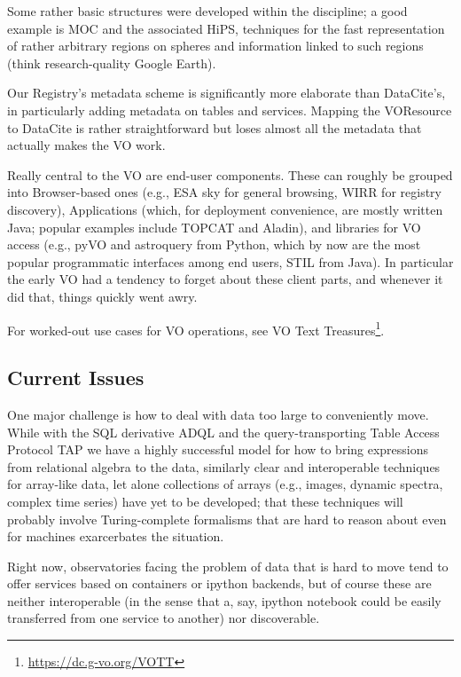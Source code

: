 Some rather basic structures were developed within the discipline; a
good example is MOC and the associated HiPS, techniques for the fast
representation of rather arbitrary regions on spheres and information
linked to such regions (think research-quality Google Earth).

Our Registry's metadata scheme is significantly more elaborate than
DataCite's, in particularly adding metadata on tables and services.
Mapping the VOResource to DataCite is rather straightforward but loses
almost all the metadata that actually makes the VO work.

Really central to the VO are end-user components.  These can roughly be
grouped into Browser-based ones (e.g., ESA sky for general browsing,
WIRR for registry discovery), Applications (which, for deployment
convenience, are mostly written Java; popular examples include TOPCAT
and Aladin), and libraries for VO access (e.g., pyVO and astroquery from
Python, which by now are the most popular programmatic interfaces among
end users, STIL from Java).  In particular the early VO had a tendency
to forget about these client parts, and whenever it did that, things
quickly went awry.

For worked-out use cases for VO operations, see VO Text
Treasures\footnote{\url{https://dc.g-vo.org/VOTT}}.

\subsection{Current Issues}

One major challenge is how to deal with data too large to conveniently
move.  While with the SQL derivative ADQL and the query-transporting
Table Access Protocol TAP we have a highly successful model for how to
bring expressions from relational algebra to the data, similarly clear and
interoperable techniques for array-like data, let alone collections of
arrays (e.g., images, dynamic spectra, complex time series) have yet to
be developed; that these techniques will probably involve
Turing-complete formalisms that are hard to reason about even for
machines exarcerbates the situation.  

Right now, observatories facing the problem of data that is hard to move
tend to offer services based on containers or ipython backends, but of
course these are neither interoperable (in the sense that a, say,
ipython notebook could be easily transferred from one service to
another) nor discoverable.

